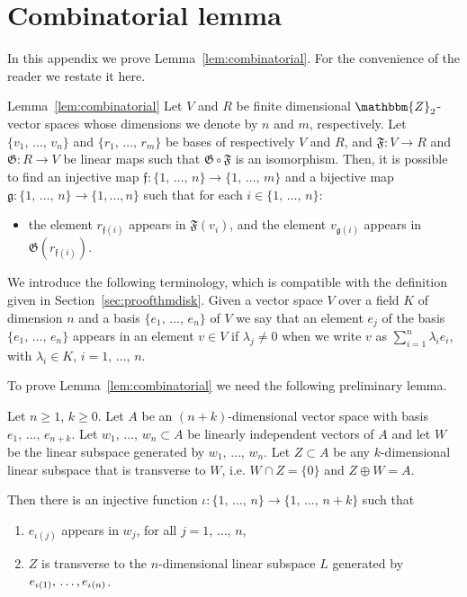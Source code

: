 \documentclass[AHL,Unicode,longabstracts,published]{cedram}
\newcommand{\Z}{\mathbbm{Z}}
\newcommand{\fkg}{\mathfrak{g}}
\newcommand{\fkF}{\mathfrak{F}}
\newcommand{\fkG}{\mathfrak{G}}
\newcommand{\fkf}{\mathfrak{f}}
\begin{document}
\appendix


\section{Combinatorial lemma} \label{appendix:comblemma}
In this appendix we prove Lemma~\ref{lem:combinatorial}. For the convenience of the reader we restate it here.

\begin{enonce*}{Lemma~\ref{lem:combinatorial}}
Let $V$ and $R$ be finite dimensional $\Z_2$-vector spaces whose dimensions we denote by $n$ and $m$, respectively. Let $\{v_1,\,\ldots,\,v_{n}\}$ and $\{r_1,\,\ldots,\,r_{m}\}$ be bases of respectively $V$ and $R$, and $\fkF: V \to R$ and $\fkG: R \to V $ be linear maps such that $\fkG \circ \fkF$ is an isomorphism. Then, it is possible to find an injective map $\fkf: \{1,\,\ldots,\,n\} \to \{1,\,\ldots,\,m\}$ and a bijective map $\fkg: \{1,\,\ldots,\,n\} \to \{1,\ldots,n\}$ such that for each $i\in \{1,\,\ldots,\,n\}$:
\begin{itemize}
\item the element $r_{\fkf(i)}$ appears in $\fkF(v_i) $, and the element $v_{\fkg(i)}$ appears in $\fkG(r_{\fkf(i)}) $.
\end{itemize}
\end{enonce*}

We introduce the following terminology, which is compatible with the definition given in Section~\ref{sec:proofthmdisk}. Given a vector space $V$ over a field $K$ of dimension $n$ and a basis $\{e_1,\,\ldots,\,e_n\}$ of $V$ we say that an element $e_j$ of the basis $\{e_1,\,\ldots,\,e_{n}\}$ appears in an element $v\in V$ if $\lambda_j \neq 0$ when we write $v$ as $\sum_{i=1}^n \lambda_i e_i$, with $\lambda_i \in K$, $i=1,\,\ldots,\, n$.

To prove Lemma~\ref{lem:combinatorial} we need the following preliminary lemma.

\begin{lemm} \label{lem:prelim}
Let $n\geq 1$, $k\geq 0$. Let $A$ be an $(n+k)$-dimensional vector space with basis $e_1,\, \ldots,\, e_{n+k}$. Let $w_1, \,\ldots,\, w_n \subset A$ be linearly independent vectors of $A$ and let $W$ be the linear subspace generated by $w_1, \,\ldots,\, w_n$. Let $Z \subset A$ be any $k$-dimensional linear subspace that is transverse to $W$, i.e. $W\cap Z = \{0\}$ and $Z \oplus W = A$.

Then there is an injective function $\iota:\{1,\, \ldots,\, n\} \to \{1,\, \ldots,\, n+k\}$ such that
\begin{enumerate}
\item $e_{\iota(j)}$ appears in $w_j$, for all $j=1, \,\ldots,\, n$,
\item $Z$ is transverse to the $n$-dimensional linear subspace $L$ generated by $e_{\iota(1)}, \,\ldots,\linebreak e_{\iota(n)}$.
\end{enumerate}
\end{lemm}
\end{document}
